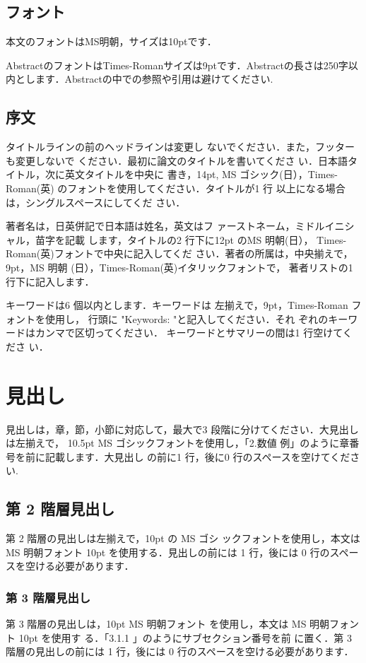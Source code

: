 \documentclass{brccms-hu}
\begin{document}
\subsection{フォント}
本文のフォントはMS明朝，サイズは10ptです．

AbstractのフォントはTimes-Romanサイズは9ptです．Abstractの長さは250字以内とします．Abstractの中での参照や引用は避けてください.
\subsection{序文}
タイトルラインの前のヘッドラインは変更し
ないでください．また，フッターも変更しないで
ください．最初に論文のタイトルを書いてくださ
い．日本語タイトル，次に英文タイトルを中央に
書き，14pt, MS ゴシック(日），Times-Roman(英)
のフォントを使用してください．タイトルが1 行
以上になる場合は，シングルスペースにしてくだ
さい．

著者名は，日英併記で日本語は姓名，英文はフ
ァーストネーム，ミドルイニシャル，苗字を記載
します，タイトルの2 行下に12pt のMS 明朝(日），
Times-Roman(英)フォントで中央に記入してくだ
さい．著者の所属は，中央揃えで，9pt，MS 明朝
(日），Times-Roman(英)イタリックフォントで，
著者リストの1 行下に記入します．

キーワードは6 個以内とします．キーワードは
左揃えで，9pt，Times-Roman フォントを使用し，
行頭に "Keywords: "と記入してください．それ
ぞれのキーワードはカンマで区切ってください．
キーワードとサマリーの間は1 行空けてくださ
い．
\section{見出し}
見出しは，章，節，小節に対応して，最大で3
段階に分けてください．大見出しは左揃えで，
10.5pt MS ゴシックフォントを使用し，「2.数値
例」のように章番号を前に記載します．大見出し
の前に1 行，後に0 行のスペースを空けてくださ
い.
\subsection{第 2 階層見出し}
第 2 階層の見出しは左揃えで，10pt の MS ゴシ
ックフォントを使用し，本文は MS 明朝フォント
10pt を使用する．見出しの前には 1 行，後には 0
行のスペースを空ける必要があります．
\subsubsection{第 3 階層見出し}
第 3 階層の見出しは，10pt MS 明朝フォント
を使用し，本文は MS 明朝フォント 10pt を使用す
る．「3.1.1 」のようにサブセクション番号を前
に置く．第 3 階層の見出しの前には 1 行，後には
0 行のスペースを空ける必要があります．
\end{document}
